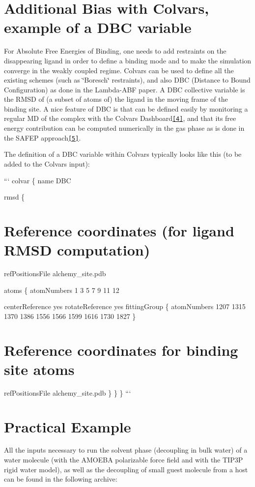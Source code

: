 \section*{Additional Bias with Colvars, example of a D\-B\-C variable}

For Absolute Free Energies of Binding, one needs to add restraints on the disappearing ligand in order to define a binding mode and to make the simulation converge in the weakly coupled regime. Colvars can be used to define all the existing schemes (such as \char`\"{}\-Boresch\char`\"{} restraints), and also D\-B\-C (Distance to Bound Configuration) as done in the Lambda-\/\-A\-B\-F paper. A D\-B\-C collective variable is the R\-M\-S\-D of (a subset of atoms of) the ligand in the moving frame of the binding site. A nice feature of D\-B\-C is that can be defined easily by monitoring a regular M\-D of the complex with the Colvars Dashboard\href{#4}{\tt \mbox{[}4\mbox{]}}, and that its free energy contribution can be computed numerically in the gas phase as is done in the S\-A\-F\-E\-P approach\href{#5}{\tt \mbox{[}5\mbox{]}}.

The definition of a D\-B\-C variable within Colvars typically looks like this (to be added to the Colvars input)\-:

``` colvar \{ name D\-B\-C

rmsd \{ \section*{Reference coordinates (for ligand R\-M\-S\-D computation)}

ref\-Positions\-File alchemy\-\_\-site.\-pdb

atoms \{ atom\-Numbers 1 3 5 7 9 11 12

center\-Reference yes rotate\-Reference yes fitting\-Group \{ atom\-Numbers 1207 1315 1370 1386 1556 1566 1599 1616 1730 1827 \} \section*{Reference coordinates for binding site atoms}

ref\-Positions\-File alchemy\-\_\-site.\-pdb \} \} \} ```

\section*{Practical Example}

All the inputs necessary to run the solvent phase (decoupling in bulk water) of a water molecule (with the A\-M\-O\-E\-B\-A polarizable force field and with the T\-I\-P3\-P rigid water model), as well as the decoupling of small guest molecule from a host can be found in the following archive\-:

